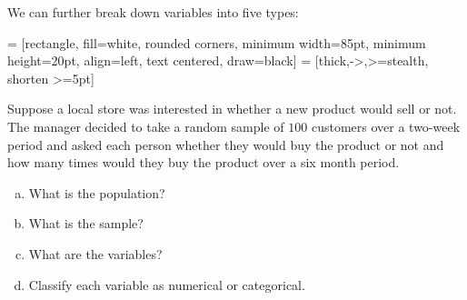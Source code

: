 \documentclass[../mathNotesPreamble]{subfiles}
\begin{document}
  We can further break down variables into five types:
  \begin{center}
     = [rectangle, 
      fill=white,
      rounded corners, 
      minimum width=85pt, 
      minimum height=20pt,
      align=left,
      text centered, 
      draw=black]
     = [thick,->,>=stealth, shorten >=5pt]
  \end{center}
  \pagebreak
  \begin{ex*}
    Suppose a local store was interested in whether a new product would sell or not. The manager decided to take a random sample of $100$ customers over a two-week period and asked each person whether they would buy the product or not and how many times would they buy the product over a six month period.
    \begin{enumerate}[a)]
      \item What is the population?
      \item What is the sample?
      \item What are the variables?
      \item Classify each variable as numerical or categorical.
    \end{enumerate}
  \end{ex*}

  \pagebreak
\end{document}
